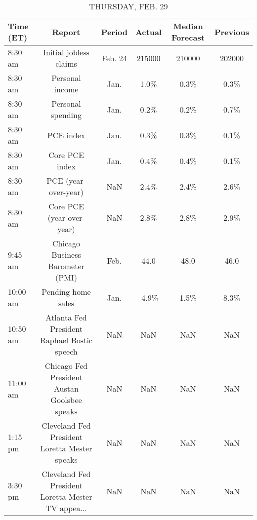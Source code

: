 \documentclass{article}%
\begin{document}
\begin{table}[htbp]%
\caption{THURSDAY, FEB. 29}%
\centering%
\begin{adjustbox}{width=1\textwidth}%
\begin{tabular}{lccccc}
\toprule
Time (ET) &                                             Report &  Period & Actual & Median Forecast & Previous \\
\midrule
  8:30 am &                             Initial jobless claims & Feb. 24 & 215000 &          210000 &   202000 \\
  8:30 am &                                    Personal income &    Jan. &   1.0\% &            0.3\% &     0.3\% \\
  8:30 am &                                  Personal spending &    Jan. &   0.2\% &            0.2\% &     0.7\% \\
  8:30 am &                                          PCE index &    Jan. &   0.3\% &            0.3\% &     0.1\% \\
  8:30 am &                                     Core PCE index &    Jan. &   0.4\% &            0.4\% &     0.1\% \\
  8:30 am &                               PCE (year-over-year) &     NaN &   2.4\% &            2.4\% &     2.6\% \\
  8:30 am &                          Core PCE (year-over-year) &     NaN &   2.8\% &            2.8\% &     2.9\% \\
  9:45 am &                   Chicago Business Barometer (PMI) &    Feb. &   44.0 &            48.0 &     46.0 \\
 10:00 am &                                 Pending home sales &    Jan. &  -4.9\% &            1.5\% &     8.3\% \\
 10:50 am &        Atlanta Fed President Raphael Bostic speech &     NaN &    NaN &             NaN &      NaN \\
 11:00 am &       Chicago Fed President Austan Goolsbee speaks &     NaN &    NaN &             NaN &      NaN \\
  1:15 pm &      Cleveland Fed President Loretta Mester speaks &     NaN &    NaN &             NaN &      NaN \\
  3:30 pm & Cleveland Fed President Loretta Mester TV appea... &     NaN &    NaN &             NaN &      NaN \\
\bottomrule
\end{tabular}
%
\end{adjustbox}%
\end{table}
\end{document}
